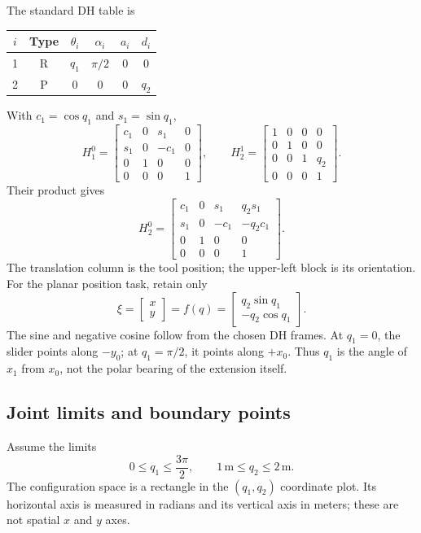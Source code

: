 The standard DH table is
\begin{center}
\begin{tabular}{cccccc}
\toprule
$i$ & Type & $\theta_i$ & $\alpha_i$ & $a_i$ & $d_i$\\
\midrule
1 & R & $q_1$ & $\pi/2$ & $0$ & $0$\\
2 & P & $0$ & $0$ & $0$ & $q_2$\\
\bottomrule
\end{tabular}
\end{center}
With $c_1=\cos q_1$ and $s_1=\sin q_1$,
\[
 H_1^0=\begin{bmatrix}c_1&0&s_1&0\\s_1&0&-c_1&0\\
 0&1&0&0\\0&0&0&1\end{bmatrix},\qquad
 H_2^1=\begin{bmatrix}1&0&0&0\\0&1&0&0\\0&0&1&q_2\\0&0&0&1\end{bmatrix}.
\]
Their product gives
\begin{equation}
 H_2^0=\begin{bmatrix}
 c_1&0&s_1&q_2s_1\\s_1&0&-c_1&-q_2c_1\\
 0&1&0&0\\0&0&0&1
 \end{bmatrix}.
 \label{eq:l11-rp-H}
\end{equation}
The translation column is the tool position; the upper-left block is its
orientation. For the planar position task, retain only
\begin{equation}
 \boxed{\xi=\begin{bmatrix}x\\y\end{bmatrix}
 =f(q)=\begin{bmatrix}q_2\sin q_1\\-q_2\cos q_1\end{bmatrix}.}
 \label{eq:l11-rp-map}
\end{equation}
The sine and negative cosine follow from the chosen DH frames. At $q_1=0$,
the slider points along $-y_0$; at $q_1=\pi/2$, it points along $+x_0$.
Thus $q_1$ is the angle of $x_1$ from $x_0$, not the polar bearing of
the extension itself.

\subsection{Joint limits and boundary points}
Assume the limits
\begin{equation}
 0\le q_1\le\frac{3\pi}{2},\qquad
 1\,\mathrm m\le q_2\le2\,\mathrm m.
 \label{eq:l11-limits}
\end{equation}
The configuration space is a rectangle in the $(q_1,q_2)$ coordinate
plot. Its horizontal axis is measured in radians and its vertical axis
in meters; these are not spatial $x$ and $y$ axes.


